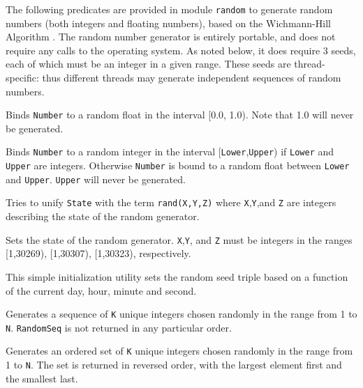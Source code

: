 The following predicates are provided in module \texttt{random} to
generate random numbers (both integers and floating numbers), based on
the Wichmann-Hill Algorithm \cite{WicH82,McLe85}.  The random number
generator is entirely portable, and does not require any calls to the
operating system.  As noted below, it does require 3 seeds, each of
which must be an integer in a given range.  These seeds are
thread-specific: thus different threads may generate independent
sequences of random numbers.

\begin{description}

 
%
Binds \texttt{Number} to a random float in the interval [0.0, 1.0).
Note that 1.0 will never be generated.

 
    Binds \texttt{Number} to a random integer in the interval
    [\texttt{Lower},\texttt{Upper}) if \texttt{Lower} and \texttt{Upper}
    are integers.  Otherwise \texttt{Number} is bound to a random float
    between \texttt{Lower} and \texttt{Upper}.  \texttt{Upper} will
    never be generated.

 
    Tries to unify \texttt{State} with the term \texttt{rand(X,Y,Z)}
    where \texttt{X},\texttt{Y},and \texttt{Z} are integers describing
    the state of the random generator.

 
    Sets the state of the random generator.  \texttt{X},\texttt{Y}, and
    \texttt{Z} must be integers in the ranges [1,30269), [1,30307),
    [1,30323), respectively.

 
This simple initialization utility sets the random seed triple based on a
function of the current day, hour, minute and second. 

 
    Generates a sequence of \texttt{K} unique integers chosen randomly
    in the range from 1 to \texttt{N}.  \texttt{RandomSeq} is not
    returned in any particular order.

 
    Generates an ordered set of \texttt{K} unique integers chosen
    randomly in the range from 1 to \texttt{N}.  The set is returned in
    reversed order, with the largest element first and the smallest
    last.

\end{description}

